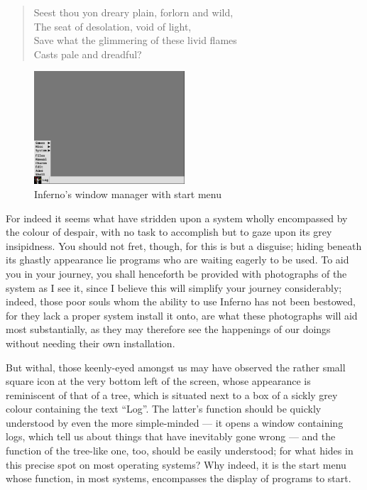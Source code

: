 \documentclass[a5paper,twoside,12pt]{report}
\begin{document}
  \begin{quote}
    Seest thou yon dreary plain, forlorn and wild, \\
    The seat of desolation, void of light, \\
    Save what the glimmering of these livid flames \\
    Casts pale and dreadful?
  \end{quote}

  \begin{figure}
    \centering
    \includegraphics[width=0.5\textwidth]{imgs/start_menu.png}
    \caption{Inferno's window manager with start menu}
  \end{figure}

  For indeed it seems what have stridden upon a system wholly encompassed by the colour of despair, with no task to accomplish but to gaze upon its grey insipidness. You should not fret, though, for this is but a disguise; hiding beneath its ghastly appearance lie programs who are waiting eagerly to be used. To aid you in your journey, you shall henceforth be provided with photographs of the system as I see it, since I believe this will simplify your journey considerably; indeed, those poor souls whom the ability to use Inferno has not been bestowed, for they lack a proper system install it onto, are what these photographs will aid most substantially, as they may therefore see the happenings of our doings without needing their own installation.

  But withal, those keenly-eyed amongst us may have observed the rather small square icon at the very bottom left of the screen, whose appearance is reminiscent of that of a tree, which is situated next to a box of a sickly grey colour containing the text ``Log''. The latter's function should be quickly understood by even the more simple-minded — it opens a window containing logs, which tell us about things that have inevitably gone wrong — and the function of the tree-like one, too, should be easily understood; for what hides in this precise spot on most operating systems? Why indeed, it is the start menu whose function, in most systems, encompasses the display of programs to start.
\end{document}
